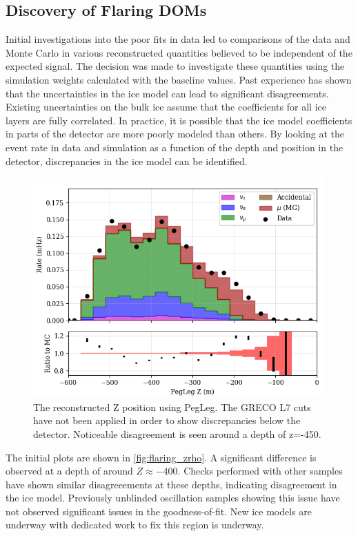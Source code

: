 \subsection{Discovery of Flaring DOMs}
Initial investigations into the poor fits in data led to comparisons of the data and Monte Carlo in various reconstructed quantities believed to be independent of the expected signal.
The decision was made to investigate these quantities using the simulation weights calculated with the baseline values.
Past experience has shown that the uncertainties in the ice model can lead to significant disagreements.
Existing uncertainties on the bulk ice assume that the coefficients for all ice layers are fully correlated.
In practice, it is possible that the ice model coefficients in parts of the detector are more poorly modeled than others.
By looking at the event rate in data and simulation as a function of the depth and position in the detector, discrepancies in the ice model can be identified.

\begin{center}
\label{fig:flaring_zrho}
\begin{figure}
	\includegraphics[width=0.6\linewidth]{L7_reco_z.png}
\caption{The reconstructed Z position using PegLeg. The GRECO L7 cuts have not been applied in order to show discrepancies below the detector. Noticeable disagreement is seen around a depth of z=-450.}
\end{figure}
\end{center}

The initial plots are shown in \ref{fig:flaring_zrho}.
A significant difference is observed at a depth of around ${Z\approx -400}$.
Checks performed with other samples have shown similar disagreeements at these depths, indicating disagreement in the ice model.
Previously unblinded oscillation samples showing this issue have not observed significant issues in the goodness-of-fit.
New ice models are underway with dedicated work to fix this region is underway.

